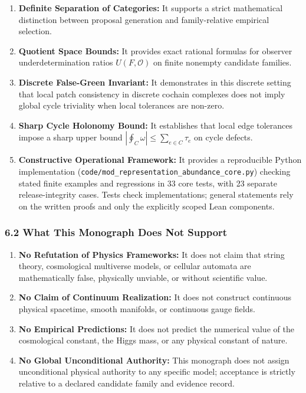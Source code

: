 \documentclass[
  10pt,
]{article}
\begin{document}
\begin{enumerate}
\def\labelenumi{\arabic{enumi}.}
\item
  \textbf{Definite Separation of Categories:} It supports a strict mathematical distinction between proposal generation and family-relative empirical selection.
\item
  \textbf{Quotient Space Bounds:} It provides exact rational formulas for observer underdetermination ratios \hypertarget{math-E0002-0341}{}{\(U(F, \mathcal{O})\)} on finite nonempty candidate families.
\item
  \textbf{Discrete False-Green Invariant:} It demonstrates in this discrete setting that local patch consistency in discrete cochain complexes does not imply global cycle triviality when local tolerances are non-zero.
\item
  \textbf{Sharp Cycle Holonomy Bound:} It establishes that local edge tolerances impose a sharp upper bound \hypertarget{math-E0224-0342}{}{\(|\oint_C \omega| \le \sum_{e \in C} \tau_e\)} on cycle defects.
\item
  \textbf{Constructive Operational Framework:} It provides a reproducible Python implementation (\texttt{code/mod\_representation\_abundance\_core.py}) checking stated finite examples and regressions in 33 core tests, with 23 separate release-integrity cases. Tests check implementations; general statements rely on the written proofs and only the explicitly scoped Lean components.
\end{enumerate}

\subsubsection{6.2 What This Monograph Does Not Support}\label{what-this-monograph-does-not-support}

\begin{enumerate}
\def\labelenumi{\arabic{enumi}.}
\item
  \textbf{No Refutation of Physics Frameworks:} It does not claim that string theory, cosmological multiverse models, or cellular automata are mathematically false, physically unviable, or without scientific value.
\item
  \textbf{No Claim of Continuum Realization:} It does not construct continuous physical spacetime, smooth manifolds, or continuous gauge fields.
\item
  \textbf{No Empirical Predictions:} It does not predict the numerical value of the cosmological constant, the Higgs mass, or any physical constant of nature.
\item
  \textbf{No Global Unconditional Authority:} This monograph does not assign unconditional physical authority to any specific model; acceptance is strictly relative to a declared candidate family and evidence record.
\end{enumerate}
\end{document}
